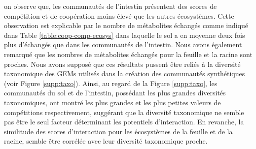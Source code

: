 \documentclass[../main.tex]{subfiles}
\begin{document}
on observe que, les communautés de l'intestin présentent des scores de compétition et de coopération moins élevé que les autres écosystèmes. Cette observation est explicable par le nombre de métabolites échangés comme indiqué dans Table \ref{table:coop-comp-ecosys} dans laquelle le sol a en moyenne deux fois plus d'échangés que dans les communautés de l'intestin. Nous avons également remarqué que les nombres de métabolites échangés pour la feuille et la racine sont proches. Nous avons supposé que ces résultats pussent être reliés à la diversité taxonomique des GEMs utilisés dans la création des communautés synthétiques (voir Figure \ref{supp:taxo}). Ainsi, au regard de la Figure \ref{supp:taxo}, les communautés du sol et de l'intestin, possédant les plus grandes diversités taxonomiques, ont montré les plus grandes et les plus petites valeurs de compétitions respectivement, suggérant que la diversité taxonomique ne semble pas être le seul facteur déterminant les potentiels d'interaction. En revanche, la similitude des scores d'interaction pour les écosystèmes de la feuille et de la racine, semble être corrélée avec leur diversité taxonomique proche.
%
%
%
\end{document}
